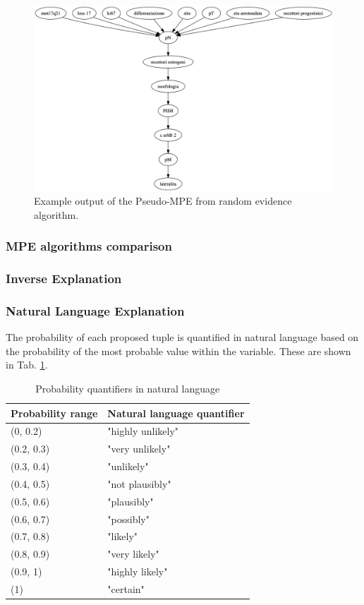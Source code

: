 \begin{figure}[htbp]
\centerline{\includegraphics[width=\columnwidth]{methodology/images/pseudo-mpe-random-example}}
\caption{Example output of the Pseudo-MPE from random evidence algorithm.}
\label{fig:pseudo-mpe-random}
\end{figure}

\subsubsection{MPE algorithms comparison}


\subsubsection{Inverse Explanation}

\subsubsection{Natural Language Explanation}
The probability of each proposed tuple is quantified in natural language based on the probability of the most probable value within the variable.
These are shown in Tab. \ref{tab:naturallanguageprobabilities}.

\begin{table}[htbp]
\caption{Probability quantifiers in natural language}
\begin{tabularx}{\textwidth}{@{} X X @{}}
\toprule 
Probability range & Natural language quantifier \\
\midrule 
(0, 0.2) &  "highly unlikely" \\
(0.2, 0.3) & "very unlikely" \\
(0.3, 0.4) & "unlikely" \\
(0.4, 0.5) & "not plausibly" \\
(0.5, 0.6) & "plausibly" \\
(0.6, 0.7) & "possibly" \\
(0.7, 0.8) & "likely" \\
(0.8, 0.9) & "very likely" \\
(0.9, 1) &  "highly likely" \\
(1) &  "certain" \\
\bottomrule
\end{tabularx}
\label{tab:naturallanguageprobabilities}
\end{table}


